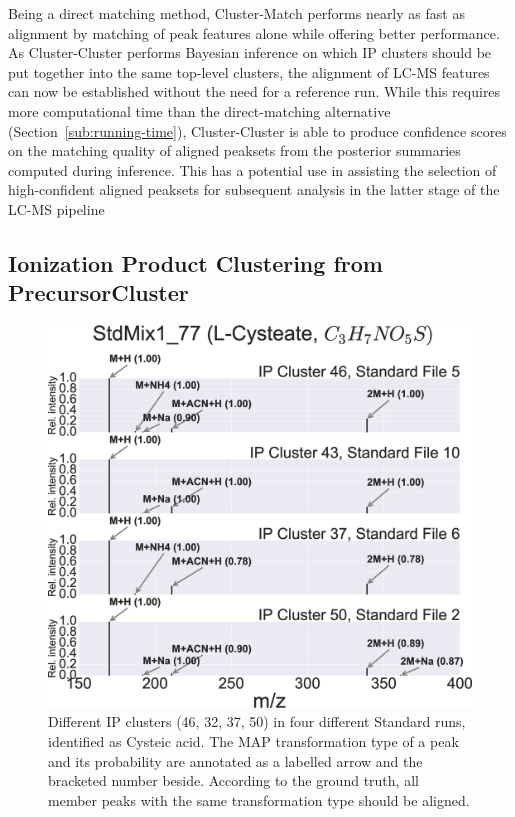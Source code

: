 Being a direct matching method, Cluster-Match performs nearly as fast as alignment by matching of peak features alone while offering better performance. As Cluster-Cluster performs Bayesian inference on which IP clusters should be put together into the same top-level clusters, the alignment of LC-MS features can now be established without the need for a reference run. While this requires more computational time than the direct-matching alternative (Section~\ref{sub:running-time}), Cluster-Cluster is able to produce confidence scores on the matching quality of aligned peaksets from the posterior summaries computed during inference. This has a potential use in assisting the selection of high-confident aligned peaksets for subsequent analysis in the latter stage of the LC-MS pipeline

\subsection{Ionization Product Clustering from PrecursorCluster\label{sub:precursor-cluster-results}}

\begin{figure}[!htbp]
\centering
\includegraphics[width=0.6\linewidth]{05-precursor-cluster/figures/l_cysteate.eps}
\caption{\label{fig:06} Different IP clusters (46, 32, 37, 50) in four different Standard runs, identified as Cysteic acid. The MAP transformation type of a peak and its probability are annotated as a labelled arrow and the bracketed number beside. According to the ground truth, all member peaks with the same transformation type should be aligned.}
\end{figure}

